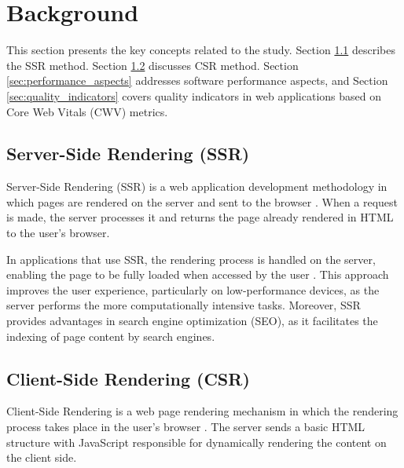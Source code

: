 \section{Background}
\label{sec:background}

This section presents the key concepts related to the study. Section \ref{sec:ssr} describes the SSR method. Section \ref{sec:csr} discusses CSR method. Section \ref{sec:performance_aspects} addresses software performance aspects, and Section \ref{sec:quality_indicators} covers quality indicators in web applications based on  Core Web Vitals (CWV) metrics.

\subsection{Server-Side Rendering (SSR)}
\label{sec:ssr}

Server-Side Rendering (SSR) is a web application development methodology in which pages are rendered on the server and sent to the browser \cite{clientServerSide:2020}. When a request is made, the server processes it and returns the page already rendered in HTML to the user's browser.


In applications that use SSR, the rendering process is handled on the server, enabling the page to be fully loaded when accessed by the user \citet{clientServerSide:2020}. This approach improves the user experience, particularly on low-performance devices, as the server performs the more computationally intensive tasks. Moreover, SSR provides advantages in search engine optimization (SEO), as it facilitates the indexing of page content by search engines.

\subsection{Client-Side Rendering (CSR)}
\label{sec:csr}

Client-Side Rendering is a web page rendering mechanism in which the rendering process takes place in the user's browser \cite{clientServerSide:2020}. The server sends a basic HTML structure with JavaScript responsible for dynamically rendering the content on the client side.

